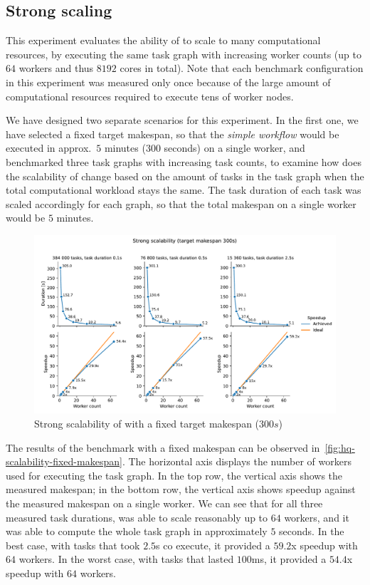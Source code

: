 \subsection{Strong scaling}
\label{sec:hq-exp-scalability}
This experiment evaluates the ability of \hyperqueue{} to scale to many computational
resources, by executing the same task graph with increasing worker counts (up to
$64$ workers and thus $8192$ cores in total). Note that each
benchmark configuration in this experiment was measured only once because of the large amount of
computational resources required to execute tens of worker nodes.

We have designed two separate scenarios for this experiment. In the first one, we have selected a
fixed target makespan, so that the \emph{simple workflow} would be executed in approx.\ $5$
minutes ($300$ seconds) on a single worker, and benchmarked three task graphs with
increasing task counts, to examine how does the scalability of \hyperqueue{} change based
on the amount of tasks in the task graph when the total computational workload stays the same. The
task duration of each task was scaled accordingly for each graph, so that the total makespan on a
single worker would be $5$ minutes.

\begin{figure}[h]
	\centering
	\includegraphics[width=\textwidth]{imgs/hq/charts/scalability-fixed-makespan}
	\caption{Strong scalability of \hyperqueue{} with a fixed target makespan ($300s$)}
	\label{fig:hq-scalability-fixed-makespan}
\end{figure}

The results of the benchmark with a fixed makespan can be observed in~\autoref{fig:hq-scalability-fixed-makespan}. The
horizontal axis displays the number of workers used for executing the task graph. In the top row,
the vertical axis shows the measured makespan; in the bottom row, the vertical axis shows speedup
against the measured makespan on a single worker. We can see that for all three measured task
durations, \hyperqueue{} was able to scale reasonably up to $64$
workers, and it was able to compute the whole task graph in approximately $5$
seconds. In the best case, with tasks that took $2.5$s co execute, it provided a
$59.2$x speedup with $64$ workers. In the worst case, with tasks
that lasted $100$ms, it provided a $54.4$x speedup with
$64$ workers.

